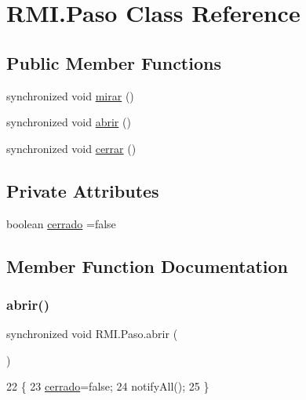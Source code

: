 \hypertarget{class_r_m_i_1_1_paso}{}\section{R\+M\+I.\+Paso Class Reference}
\label{class_r_m_i_1_1_paso}
\subsection*{Public Member Functions}
\begin{DoxyCompactItemize}
\item 
synchronized void \mbox{\hyperlink{class_r_m_i_1_1_paso_a988694346834bbf37f12e3ea425a277c}{mirar}} ()
\item 
synchronized void \mbox{\hyperlink{class_r_m_i_1_1_paso_a812e38e5e102e7da3fbd1ba669baa213}{abrir}} ()
\item 
synchronized void \mbox{\hyperlink{class_r_m_i_1_1_paso_a94a5334985d909a4db0b5efda2f68a9f}{cerrar}} ()
\end{DoxyCompactItemize}
\subsection*{Private Attributes}
\begin{DoxyCompactItemize}
\item 
boolean \mbox{\hyperlink{class_r_m_i_1_1_paso_acf12d24b9ce56005480644624d042067}{cerrado}} =false
\end{DoxyCompactItemize}


\subsection{Member Function Documentation}
\mbox{\label{class_r_m_i_1_1_paso_a812e38e5e102e7da3fbd1ba669baa213}} 
\subsubsection{\texorpdfstring{abrir()}{abrir()}}
{\footnotesize\ttfamily synchronized void R\+M\+I.\+Paso.\+abrir (\begin{DoxyParamCaption}{ }\end{DoxyParamCaption})\hspace{0.3cm}{\ttfamily [inline]}}


\begin{DoxyCode}
22     \{
23         \mbox{\hyperlink{class_r_m_i_1_1_paso_acf12d24b9ce56005480644624d042067}{cerrado}}=\textcolor{keyword}{false};
24         notifyAll();
25     \}
\end{DoxyCode}
\mbox{\label{class_r_m_i_1_1_paso_a94a5334985d909a4db0b5efda2f68a9f}} 
